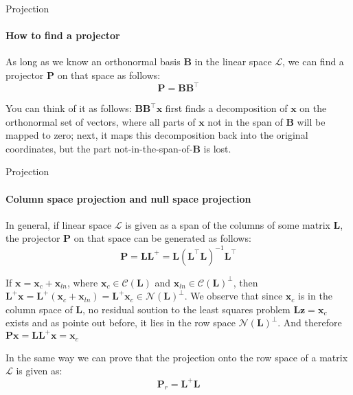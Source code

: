 \documentclass{beamer}
\begin{document}
\begin{frame}{Projection}
\framesubtitle{How to find a projector}
\begin{flushleft}

As long as we know an orthonormal basis $\mathbf{B}$ in the linear space $\mathcal{L}$, we can find a projector $\mathbf{P}$ on that space as follows:
%
\begin{equation}
    \mathbf{P} = \mathbf{B} \mathbf{B}^\top
\end{equation}

You can think of it as follows: $\mathbf{B} \mathbf{B}^\top \mathbf{x}$ first finds a decomposition of $\mathbf{x}$ on the orthonormal set of vectors, where all parts of $\mathbf{x}$ not in the span of $\mathbf{B}$ will be mapped to zero; next, it maps this decomposition back into the original coordinates, but the part not-in-the-span-of-$\mathbf{B}$ is lost.


\end{flushleft}
\end{frame}




\begin{frame}{Projection}
\framesubtitle{Column space projection and null space projection}
\begin{flushleft}


In general, if linear space $\mathcal{L}$ is given as a span of the columns of some matrix $\mathbf{L}$, the projector $\mathbf{P}$ on that space can be generated as follows:
%
\begin{equation}
    \mathbf{P} = \mathbf{L} \mathbf{L}^+ = \mathbf{L} (\mathbf{L}^\top \mathbf{L})^{-1} \mathbf{L}^\top
\end{equation}

If $\mathbf{x}  = \mathbf{x}_c + \mathbf{x}_{ln}$, where $\mathbf{x}_c \in \mathcal{C}(\mathbf{L})$ and $\mathbf{x}_{ln} \in \mathcal{C}(\mathbf{L})^\perp$, then $\mathbf{L}^+ \mathbf{x} = \mathbf{L}^+ (\mathbf{x}_c + \mathbf{x}_{ln}) = \mathbf{L}^+\mathbf{x}_c \in \mathcal{N}(\mathbf{L})^\perp$. We observe that since $\mathbf{x}_c$ is in the column space of $\mathbf{L}$, no residual soution to the least squares problem $\mathbf{L}\mathbf{z} = \mathbf{x}_c$ exists and as pointe out before, it lies in the row space $\mathcal{N}(\mathbf{L})^\perp$. And therefore $\mathbf{P}\mathbf{x} = \mathbf{L} \mathbf{L}^+\mathbf{x} = \mathbf{x}_c$

\bigskip

In the same way we can prove that the projection onto the row space of a matrix $\mathcal{L}$ is given as:
%
\begin{equation}
    \mathbf{P}_{r} = \mathbf{L}^+ \mathbf{L}
\end{equation}


\end{flushleft}
\end{frame}
\end{document}
